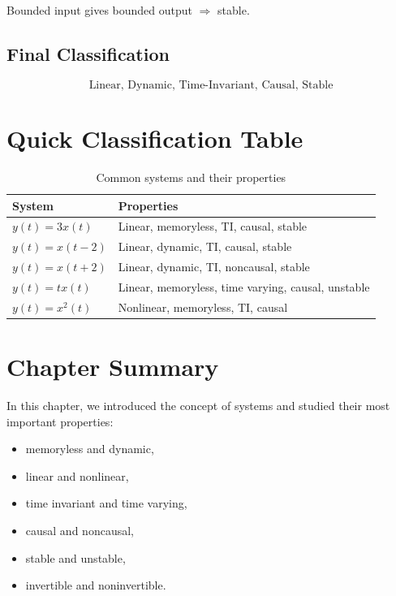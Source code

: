 Bounded input gives bounded output \(\Rightarrow\) stable.


\subsection{Final Classification}

\[
\boxed{
\text{Linear, Dynamic, Time-Invariant, Causal, Stable}
}
\]


\section{Quick Classification Table}

\begin{table}[H]
\centering
\caption{Common systems and their properties}
\begin{tabular}{|p{5cm}|p{6cm}|}
\hline
\textbf{System} & \textbf{Properties} \\
\hline
\(y(t)=3x(t)\) & Linear, memoryless, TI, causal, stable \\
\hline
\(y(t)=x(t-2)\) & Linear, dynamic, TI, causal, stable \\
\hline
\(y(t)=x(t+2)\) & Linear, dynamic, TI, noncausal, stable \\
\hline
\(y(t)=tx(t)\) & Linear, memoryless, time varying, causal, unstable \\
\hline
\(y(t)=x^2(t)\) & Nonlinear, memoryless, TI, causal \\
\hline
\end{tabular}
\end{table}


\section{Chapter Summary}

In this chapter, we introduced the concept of systems and studied their most
important properties:

\begin{itemize}
\item memoryless and dynamic,
\item linear and nonlinear,
\item time invariant and time varying,
\item causal and noncausal,
\item stable and unstable,
\item invertible and noninvertible.
\end{itemize}

